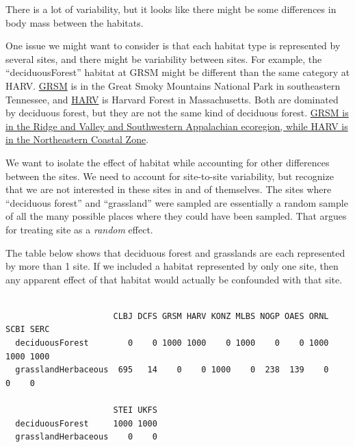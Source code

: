 \documentclass[
  13,
  letterpaper,
]{report}
\newenvironment{Shaded}{\begin{snugshade}}{\end{snugshade}}
\newcommand{\AttributeTok}[1]{\textcolor[rgb]{0.40,0.45,0.13}{#1}}
\newcommand{\FunctionTok}[1]{\textcolor[rgb]{0.28,0.35,0.67}{#1}}
\newcommand{\NormalTok}[1]{\textcolor[rgb]{0.00,0.23,0.31}{#1}}
\newcommand{\SpecialCharTok}[1]{\textcolor[rgb]{0.37,0.37,0.37}{#1}}
\newcommand{\StringTok}[1]{\textcolor[rgb]{0.13,0.47,0.30}{#1}}
\begin{document}
There is a lot of variability, but it looks like there might be some
differences in body mass between the habitats.

One issue we might want to consider is that each habitat type is
represented by several sites, and there might be variability between
sites. For example, the ``deciduousForest'' habitat at GRSM might be
different than the same category at HARV.
\href{https://www.neonscience.org/field-sites/grsm}{GRSM} is in the
Great Smoky Mountains National Park in southeastern Tennessee, and
\href{https://www.neonscience.org/field-sites/harv}{HARV} is Harvard
Forest in Massachusetts. Both are dominated by deciduous forest, but
they are not the same kind of deciduous forest.
\href{https://www.epa.gov/eco-research/level-iii-and-iv-ecoregions-continental-united-states}{GRSM
is in the Ridge and Valley and Southwestern Appalachian ecoregion, while
HARV is in the Northeastern Coastal Zone}.

We want to isolate the effect of habitat while accounting for other
differences between the sites. We need to account for site-to-site
variability, but recognize that we are not interested in these sites in
and of themselves. The sites where ``deciduous forest'' and
``grassland'' were sampled are essentially a random sample of all the
many possible places where they could have been sampled. That argues for
treating site as a \emph{random} effect.

The table below shows that deciduous forest and grasslands are each
represented by more than 1 site. If we included a habitat represented by
only one site, then any apparent effect of that habitat would actually
be confounded with that site.

\begin{Shaded}
\end{Shaded}

\begin{verbatim}
                     
                      CLBJ DCFS GRSM HARV KONZ MLBS NOGP OAES ORNL SCBI SERC
  deciduousForest        0    0 1000 1000    0 1000    0    0 1000 1000 1000
  grasslandHerbaceous  695   14    0    0 1000    0  238  139    0    0    0
                     
                      STEI UKFS
  deciduousForest     1000 1000
  grasslandHerbaceous    0    0
\end{verbatim}
\end{document}
